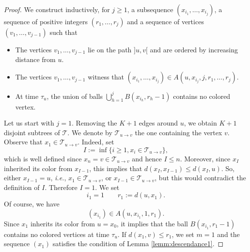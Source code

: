 \documentclass[french]{article}
\newcommand{\T}{\mathcal{T}}
\renewcommand{\1}{\mathds{1}}
\begin{document}
\begin{proof} 
We construct inductively, for $j\ge 1$, a subsequence $(x_{i_1},\ldots, x_{i_j})$, a sequence of positive integers $(r_1,\ldots,r_j)$ and a sequence of vertices $(v_1,\ldots, v_{j-1})$ such that
\begin{itemize}
\item[(i)] The vertices $v_1,\ldots,v_{j-1}$ lie on the path $]u,v[$ and are ordered by increasing distance from $u$.
 \item[(ii)] The vertices $v_1,\ldots,v_{j-1}$ witness that $(x_{i_1},\ldots, x_{i_j})\in A(u,x_{i_j},j,r_1,\ldots,r_j)$.
    \item[(iii)] At time $\tau_u$, the union of balls $\bigcup_{h=1}^j B(x_{i_h},r_h-1)$ contains no colored vertex.
\end{itemize}

Let us start with $j=1$. Removing the $K+1$ edges around $u$, we obtain $K+1$ disjoint subtrees of $\T$. We denote by $\T_{u\to v}$ the one containing the vertex $v$. Observe that $x_1\in \T_{u\to v}$. Indeed, set
$$I:=\inf\{i\ge 1, x_i\in \T_{u\to v}\},$$
which is well defined since $x_n=v\in \T_{u\to v}$ and hence $I\le n$. Moreover, since $x_{I}$ inherited its color from $x_{I-1}$, this implies that $d(x_I,x_{I-1})\le d(x_I,u)$. So, either $x_{I-1}=u$, \emph{i.e.}, $x_1\in \T_{u\to v}$, or $x_{I-1}\in \T_{u\to v}$, but this would contradict the definition of $I$. Therefore $I=1$. We set
$$i_1=1 \qquad r_1:=d(u,x_{1}).$$
 Of course, we have $$(x_{i_1})\in A(u,x_{i_1},1,r_1).$$
Since $x_{1}$ inherits its color from $u=x_0$, it implies that the ball $B(x_{i_1},r_1-1)$ contains no colored vertices at time $\tau_u$. If $d(x_1,v)\le r_1$, we set $m=1$ and the sequence $(x_1)$ satisfies the condition of Lemma \ref{lemm:descendance1}.

\medskip


\end{proof}
\end{document}
